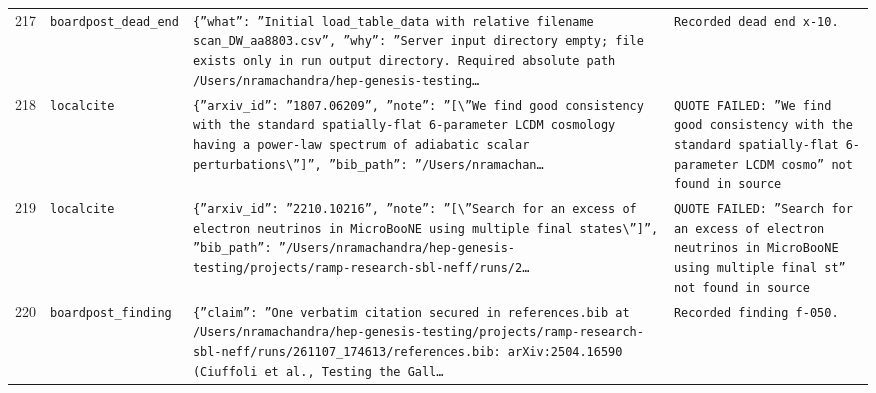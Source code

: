 \documentclass[11pt,a4paper]{article}
\begin{document}
\begin{longtable}{@{}p{}p{}p{}p{}@{}}
217 & \texttt{board}\newline\texttt{post\_\allowbreak{}dead\_\allowbreak{}end} & \texttt{\{''what'':\allowbreak{} ''Initial load\_\allowbreak{}table\_\allowbreak{}data with relative filename scan\_\allowbreak{}DW\_\allowbreak{}aa8803.csv'',\allowbreak{} ''why'':\allowbreak{} ''Server input directory empty;\allowbreak{} file exists only in run output directory. Required absolute path /\allowbreak{}Users/\allowbreak{}nramachandra/\allowbreak{}hep-genesis-testing\ldots{}\allowbreak{}} & \texttt{Recorded dead end x-10.} \\
218 & \texttt{local}\newline\texttt{cite} & \texttt{\{''arxiv\_\allowbreak{}id'':\allowbreak{} ''1807.06209'',\allowbreak{} ''note'':\allowbreak{} ''[\textbackslash{}\allowbreak{}''We find good consistency with the standard spatially-flat 6-parameter LCDM cosmology having a power-law spectrum of adiabatic scalar perturbations\textbackslash{}\allowbreak{}'']\allowbreak{}'',\allowbreak{} ''bib\_\allowbreak{}path'':\allowbreak{} ''/\allowbreak{}Users/\allowbreak{}nramachan\ldots{}\allowbreak{}} & \texttt{QUOTE FAILED:\allowbreak{} ''We find good consistency with the standard spatially-flat 6-parameter LCDM cosmo'' not found in source} \\
219 & \texttt{local}\newline\texttt{cite} & \texttt{\{''arxiv\_\allowbreak{}id'':\allowbreak{} ''2210.10216'',\allowbreak{} ''note'':\allowbreak{} ''[\textbackslash{}\allowbreak{}''Search for an excess of electron neutrinos in MicroBooNE using multiple final states\textbackslash{}\allowbreak{}'']\allowbreak{}'',\allowbreak{} ''bib\_\allowbreak{}path'':\allowbreak{} ''/\allowbreak{}Users/\allowbreak{}nramachandra/\allowbreak{}hep-genesis-testing/\allowbreak{}projects/\allowbreak{}ramp-research-sbl-neff/\allowbreak{}runs/\allowbreak{}2\ldots{}\allowbreak{}} & \texttt{QUOTE FAILED:\allowbreak{} ''Search for an excess of electron neutrinos in MicroBooNE using multiple final st'' not found in source} \\
220 & \texttt{board}\newline\texttt{post\_\allowbreak{}finding} & \texttt{\{''claim'':\allowbreak{} ''One verbatim citation secured in references.bib at /\allowbreak{}Users/\allowbreak{}nramachandra/\allowbreak{}hep-genesis-testing/\allowbreak{}projects/\allowbreak{}ramp-research-sbl-neff/\allowbreak{}runs/\allowbreak{}261107\_\allowbreak{}174613/\allowbreak{}references.bib:\allowbreak{} arXiv:\allowbreak{}2504.16590 (Ciuffoli et al.,\allowbreak{} Testing the Gall\ldots{}\allowbreak{}} & \texttt{Recorded finding f-050.} \\

\end{longtable}
\end{document}

